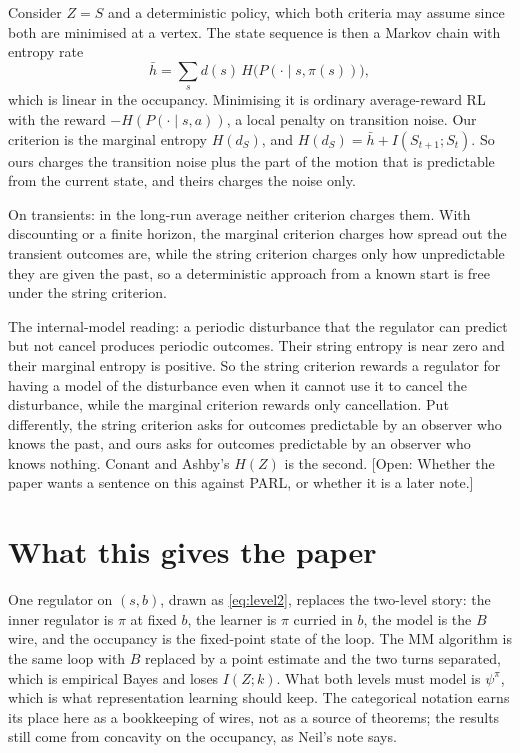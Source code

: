 \documentclass[10pt]{article}
\theoremstyle{plain}
\newcommand{\open}[1]{\textcolor{red!70!black}{[Open: #1]}}
\begin{document}
Consider $Z = S$ and a deterministic policy, which both criteria may assume since both are minimised at a vertex.
The state sequence is then a Markov chain with entropy rate
\begin{equation*}
  \bar h = \sum_{s} d(s)\, H\big(P(\cdot \mid s, \pi(s))\big),
\end{equation*}
which is linear in the occupancy.
Minimising it is ordinary average-reward RL with the reward $-H(P(\cdot \mid s,a))$, a local penalty on transition noise.
Our criterion is the marginal entropy $H(d_S)$, and $H(d_S) = \bar h + I(S_{t+1} ; S_t)$.
So ours charges the transition noise plus the part of the motion that is predictable from the current state, and theirs charges the noise only.

On transients: in the long-run average neither criterion charges them.
With discounting or a finite horizon, the marginal criterion charges how spread out the transient outcomes are, while the string criterion charges only how unpredictable they are given the past, so a deterministic approach from a known start is free under the string criterion.

The internal-model reading: a periodic disturbance that the regulator can predict but not cancel produces periodic outcomes.
Their string entropy is near zero and their marginal entropy is positive.
So the string criterion rewards a regulator for having a model of the disturbance even when it cannot use it to cancel the disturbance, while the marginal criterion rewards only cancellation.
Put differently, the string criterion asks for outcomes predictable by an observer who knows the past, and ours asks for outcomes predictable by an observer who knows nothing.
Conant and Ashby's $H(Z)$ is the second.
\open{Whether the paper wants a sentence on this against PARL, or whether it is a later note.}

\section{What this gives the paper}

One regulator on $(s,b)$, drawn as \eqref{eq:level2}, replaces the two-level story: the inner regulator is $\pi$ at fixed $b$, the learner is $\pi$ curried in $b$, the model is the $B$ wire, and the occupancy is the fixed-point state of the loop.
The MM algorithm is the same loop with $B$ replaced by a point estimate and the two turns separated, which is empirical Bayes and loses $I(Z;k)$.
What both levels must model is $\psi^\pi$, which is what representation learning should keep.
The categorical notation earns its place here as a bookkeeping of wires, not as a source of theorems; the results still come from concavity on the occupancy, as Neil's note says.


  {\newcommand{\surveybib}{notes_joery/joery_survey}}
  {\newcommand{\surveybib}{joery_survey}}

\end{document}
